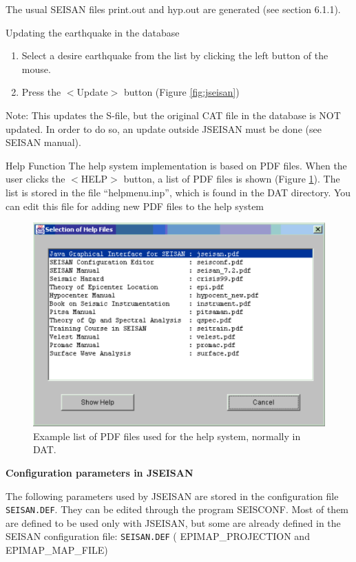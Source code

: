 The usual SEISAN files print.out and hyp.out are generated (see section 6.1.1).


Updating the earthquake in the database 

\begin{enumerate}
\item
Select a desire earthquake from the list by clicking the left button of the mouse. 
\item
Press the $<$Update$>$ button (Figure \ref{fig:jseisan}) 
\end{enumerate}

Note: This updates the S-file, but the original CAT file in the database is NOT updated. In order to do so, an update outside JSEISAN must be done (see SEISAN manual). 

Help Function\newline
{}
The help system implementation is based on PDF files. When the user clicks the $<$HELP$>$ button, a list of PDF files is shown 
(Figure \ref{fig:list-pdf-files}).
The list is stored in the file ``helpmenu.inp'', which is found in the DAT directory. You can edit this file for adding new PDF files to the help system 


\begin{figure}
\centerline{\includegraphics[width=0.9\linewidth]{fig/fig14}}
\caption{Example list of PDF files used for the help system, normally in DAT.}
\label{fig:list-pdf-files}
\end{figure}

\textbf{Configuration parameters in JSEISAN}

The following parameters used by JSEISAN are stored in the configuration file \texttt{SEISAN.DEF}. They can be edited through the program SEISCONF. Most of them are defined to be used only with JSEISAN, but some are already defined in the SEISAN configuration file: \texttt{SEISAN.DEF} ( EPIMAP\_PROJECTION and EPIMAP\_MAP\_FILE) 

